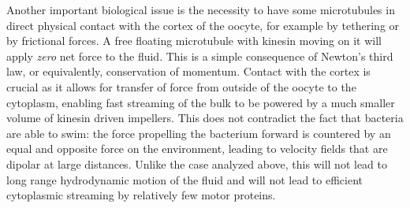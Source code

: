\documentclass[11pt]{ucthesis}
\def\br{{\bf r}}
\begin{document}
Another important biological issue is the necessity to have some microtubules in direct physical contact
with the cortex of the
oocyte, for example by tethering or by frictional forces. A free floating microtubule with kinesin moving on it will apply {\em zero} net force
to the fluid. This is a simple consequence of Newton's third law, or equivalently, conservation
of momentum. 
Contact with the cortex is crucial as it allows for transfer of force from outside of
the oocyte to the cytoplasm, enabling fast streaming of the bulk to be powered by a much smaller volume of kinesin driven
impellers.
This does not contradict
the fact that bacteria are able to swim: the force propelling the bacterium forward is
countered by an equal and opposite force on the environment, leading to velocity fields that
are dipolar at large distances. Unlike the case analyzed above, this will not lead to long range hydrodynamic motion
of the fluid and will not lead to efficient cytoplasmic streaming by relatively few motor proteins. 


\end{document}
